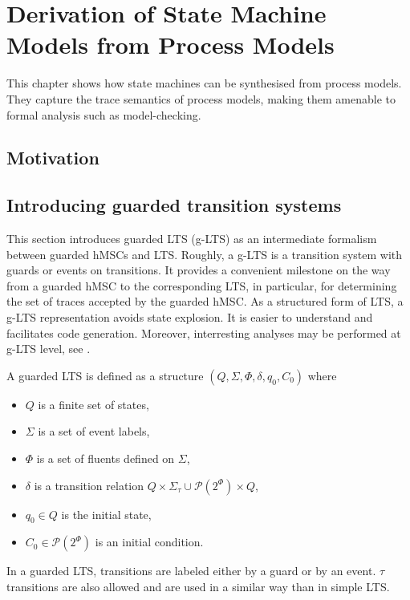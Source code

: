 \chapter{Derivation of State Machine Models from Process Models\label{chapter:deductive}}

This chapter shows how state machines can be synthesised from process models. They capture the trace semantics of process models, making them amenable to formal analysis such as model-checking.

\section{Motivation}

\section{Introducing guarded transition systems}

This section introduces guarded LTS (g-LTS) as an intermediate formalism between guarded hMSCs and LTS. Roughly, a g-LTS is a transition system with guards or events on transitions. It provides a convenient milestone on the way from a guarded hMSC to the corresponding LTS, in particular, for determining the set of traces accepted by the guarded hMSC. As a structured form of LTS, a g-LTS representation avoids state explosion. It is easier to understand and facilitates code generation. Moreover, interresting analyses may be performed at g-LTS level, see \cite{Damas:2011}.

\begin{definition}
\noindent A guarded LTS is defined as a structure $(Q,\Sigma,\Phi,\delta,q_{0},C_{0})$ where 
\begin{itemize}
\item $Q$ is a finite set of states,
\item $\Sigma$ is a set of event labels, 
\item $\Phi$ is a set of fluents defined on $\Sigma$,
\item $\delta$ is a transition relation $Q \times \Sigma_{\tau}\cup\mathcal{P}(2^\Phi) \times Q$,
\item $q_{0} \in Q$ is the initial state,
\item $C_{0} \in \mathcal{P}(2^\Phi)$ is an initial condition. 
\end{itemize}
\end{definition}

In a guarded LTS, transitions are labeled either by a guard or by an event. $\tau$ transitions are also allowed and are used in a similar way than in simple LTS. 

